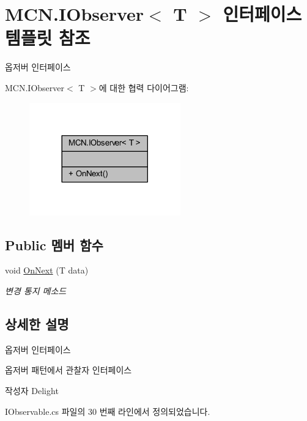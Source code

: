 \hypertarget{interface_m_c_n_1_1_i_observer}{}\section{M\+C\+N.\+I\+Observer$<$ T $>$ 인터페이스 템플릿 참조}
\label{interface_m_c_n_1_1_i_observer}


옵저버 인터페이스  




M\+C\+N.\+I\+Observer$<$ T $>$에 대한 협력 다이어그램\+:\nopagebreak
\begin{figure}[H]
\begin{center}
\leavevmode
\includegraphics[width=185pt]{interface_m_c_n_1_1_i_observer__coll__graph}
\end{center}
\end{figure}
\subsection*{Public 멤버 함수}
\begin{DoxyCompactItemize}
\item 
void \hyperlink{interface_m_c_n_1_1_i_observer_a2f934b71aa4ddf6f936670d32c3cdff7}{On\+Next} (T data)
\begin{DoxyCompactList}\small\item\em 변경 통지 메소드 \end{DoxyCompactList}\end{DoxyCompactItemize}


\subsection{상세한 설명}
옵저버 인터페이스 

옵저버 패턴에서 관찰자 인터페이스 \begin{DoxyAuthor}{작성자}
Delight 
\end{DoxyAuthor}


I\+Observable.\+cs 파일의 30 번째 라인에서 정의되었습니다.



